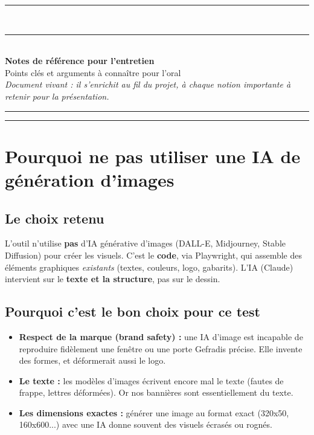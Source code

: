 \documentclass[11pt,a4paper]{article}
\begin{document}
{\color{gefblue}\rule{\textwidth}{2.5pt}}\\[0.2cm]
{\color{gefyellow}\rule{\textwidth}{6pt}}\\[0.6cm]
{\sffamily\huge\bfseries\color{gefblue} Notes de référence pour l'entretien}\\[0.3cm]
{\sffamily\large\color{gefmidnight} Points clés et arguments à connaître pour l'oral}\\[0.3cm]
{\small\itshape Document vivant : il s'enrichit au fil du projet, à chaque notion
importante à retenir pour la présentation.}\\[0.8cm]
{\color{gefblue}\rule{\textwidth}{1pt}}

\tableofcontents
\vspace{0.6cm}
\hrule
\vspace{0.6cm}

\section{Pourquoi ne pas utiliser une IA de génération d'images}

\subsection{Le choix retenu}
L'outil n'utilise \textbf{pas} d'IA générative d'images (DALL-E, Midjourney,
Stable Diffusion) pour créer les visuels. C'est le \textbf{code}, via Playwright,
qui assemble des éléments graphiques \emph{existants} (textes, couleurs, logo,
gabarits). L'IA (Claude) intervient sur le \textbf{texte et la structure}, pas sur
le dessin.

\subsection{Pourquoi c'est le bon choix pour ce test}
\begin{itemize}[leftmargin=1.4em]
  \item \textbf{Respect de la marque (brand safety) :} une IA d'image est incapable
        de reproduire fidèlement une fenêtre ou une porte Gefradis précise. Elle
        invente des formes, et déformerait aussi le logo.
  \item \textbf{Le texte :} les modèles d'images écrivent encore mal le texte
        (fautes de frappe, lettres déformées). Or nos bannières sont essentiellement
        du texte.
  \item \textbf{Les dimensions exactes :} générer une image au format exact
        (320x50, 160x600...) avec une IA donne souvent des visuels écrasés ou
        rognés.
\end{itemize}
\end{document}
